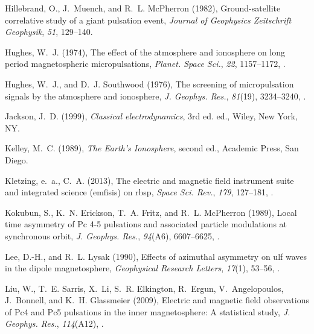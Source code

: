 \documentclass[draft,linenumbers]{agujournal}
\begin{document}
\begin{thebibliography}{50}
Hillebrand, O., J.~Muench, and R.~L. McPherron (1982), Ground-satellite
  correlative study of a giant pulsation event, \textit{Journal of Geophysics
  Zeitschrift Geophysik}, \textit{51}, 129--140.

Hughes, W.~J. (1974), The effect of the atmosphere and ionosphere on long
  period magnetospheric micropulsations, \textit{Planet. Space Sci.},
  \textit{22}, 1157--1172, .

Hughes, W.~J., and D.~J. Southwood (1976), The screening of micropulsation
  signals by the atmosphere and ionosphere, \textit{J. Geophys. Res.},
  \textit{81}(19), 3234--3240, .

Jackson, J.~D. (1999), \textit{Classical electrodynamics}, 3rd ed. ed., Wiley,
  New York, {NY}.

Kelley, M.~C. (1989), \textit{The {Earth's} Ionosphere}, second ed., Academic
  Press, San Diego.

Kletzing, e.~a., C.~A. (2013), The electric and magnetic field instrument suite
  and integrated science (emfisis) on rbsp, \textit{Space Sci. Rev.},
  \textit{179}, 127--181, .

Kokubun, S., K.~N. Erickson, T.~A. Fritz, and R.~L. McPherron (1989), Local
  time asymmetry of {Pc} 4-5 pulsations and associated particle modulations at
  synchronous orbit, \textit{J. Geophys. Res.}, \textit{94}(A6), 6607--6625,
  .

Lee, D.-H., and R.~L. Lysak (1990), Effects of azimuthal asymmetry on ulf waves
  in the dipole magnetosphere, \textit{Geophysical Research Letters},
  \textit{17}(1), 53--56, .

Liu, W., T.~E. Sarris, X.~Li, S.~R. Elkington, R.~Ergun, V.~Angelopoulos,
  J.~Bonnell, and K.~H. Glassmeier (2009), Electric and magnetic field
  observations of {Pc4} and {Pc5} pulsations in the inner magnetosphere: A
  statistical study, \textit{J. Geophys. Res.}, \textit{114}(A12),
  .


\end{thebibliography}
\end{document}
